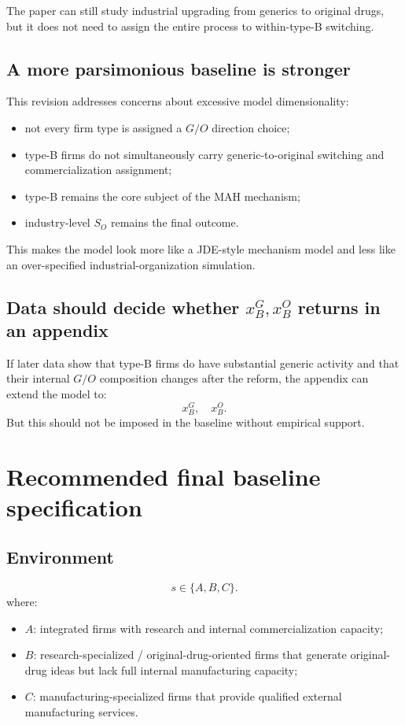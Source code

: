 \documentclass[12pt]{article}
\begin{document}
The paper can still study industrial upgrading from generics to original drugs, but it does not need to assign the entire process to within-type-B switching.

\subsection{A more parsimonious baseline is stronger}

This revision addresses concerns about excessive model dimensionality:
\begin{itemize}
    \item not every firm type is assigned a $G/O$ direction choice;
    \item type-B firms do not simultaneously carry generic-to-original switching and commercialization assignment;
    \item type-B remains the core subject of the MAH mechanism;
    \item industry-level $S_O$ remains the final outcome.
\end{itemize}

This makes the model look more like a JDE-style mechanism model and less like an over-specified industrial-organization simulation.

\subsection{Data should decide whether $x_B^G,x_B^O$ returns in an appendix}

If later data show that type-B firms do have substantial generic activity and that their internal $G/O$ composition changes after the reform, the appendix can extend the model to:
\[
x_B^G,\quad x_B^O.
\]
But this should not be imposed in the baseline without empirical support.

\section{Recommended final baseline specification}

\subsection{Environment}

\[
s\in\{A,B,C\}.
\]
where:
\begin{itemize}
    \item $A$: integrated firms with research and internal commercialization capacity;
    \item $B$: research-specialized / original-drug-oriented firms that generate original-drug ideas but lack full internal manufacturing capacity;
    \item $C$: manufacturing-specialized firms that provide qualified external manufacturing services.
\end{itemize}
\end{document}
